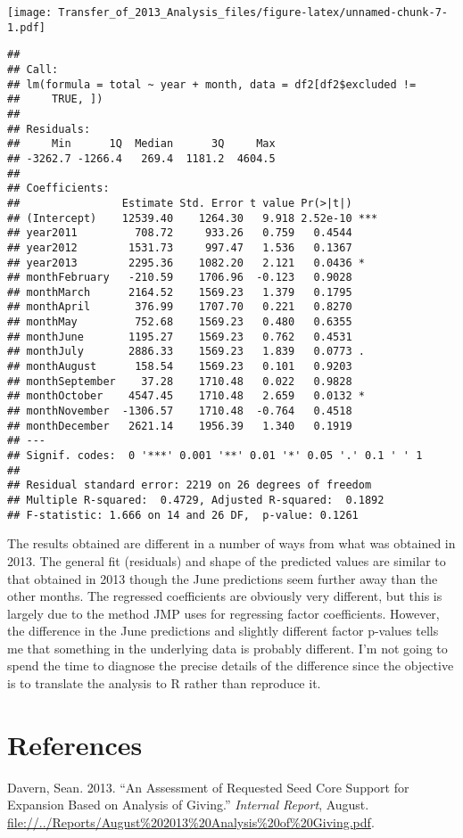 \documentclass[]{article}
\begin{document}
\texttt{[image: Transfer\_of\_2013\_Analysis\_files/figure-latex/unnamed-chunk-7-1.pdf]}

\begin{verbatim}
## 
## Call:
## lm(formula = total ~ year + month, data = df2[df2$excluded != 
##     TRUE, ])
## 
## Residuals:
##     Min      1Q  Median      3Q     Max 
## -3262.7 -1266.4   269.4  1181.2  4604.5 
## 
## Coefficients:
##                Estimate Std. Error t value Pr(>|t|)    
## (Intercept)    12539.40    1264.30   9.918 2.52e-10 ***
## year2011         708.72     933.26   0.759   0.4544    
## year2012        1531.73     997.47   1.536   0.1367    
## year2013        2295.36    1082.20   2.121   0.0436 *  
## monthFebruary   -210.59    1706.96  -0.123   0.9028    
## monthMarch      2164.52    1569.23   1.379   0.1795    
## monthApril       376.99    1707.70   0.221   0.8270    
## monthMay         752.68    1569.23   0.480   0.6355    
## monthJune       1195.27    1569.23   0.762   0.4531    
## monthJuly       2886.33    1569.23   1.839   0.0773 .  
## monthAugust      158.54    1569.23   0.101   0.9203    
## monthSeptember    37.28    1710.48   0.022   0.9828    
## monthOctober    4547.45    1710.48   2.659   0.0132 *  
## monthNovember  -1306.57    1710.48  -0.764   0.4518    
## monthDecember   2621.14    1956.39   1.340   0.1919    
## ---
## Signif. codes:  0 '***' 0.001 '**' 0.01 '*' 0.05 '.' 0.1 ' ' 1
## 
## Residual standard error: 2219 on 26 degrees of freedom
## Multiple R-squared:  0.4729, Adjusted R-squared:  0.1892 
## F-statistic: 1.666 on 14 and 26 DF,  p-value: 0.1261
\end{verbatim}

The results obtained are different in a number of ways from what was
obtained in 2013. The general fit (residuals) and shape of the predicted
values are similar to that obtained in 2013 though the June predictions
seem further away than the other months. The regressed coefficients are
obviously very different, but this is largely due to the method JMP uses
for regressing factor coefficients. However, the difference in the June
predictions and slightly different factor p-values tells me that
something in the underlying data is probably different. I'm not going to
spend the time to diagnose the precise details of the difference since
the objective is to translate the analysis to R rather than reproduce
it.

\hypertarget{references}{%
\section*{References}\label{references}}

\hypertarget{refs}{}
\leavevmode\hypertarget{ref-davern2013}{}%
Davern, Sean. 2013. ``An Assessment of Requested Seed Core Support for
Expansion Based on Analysis of Giving.'' \emph{Internal Report}, August.
\url{file://../Reports/August\%202013\%20Analysis\%20of\%20Giving.pdf}.
\end{document}
